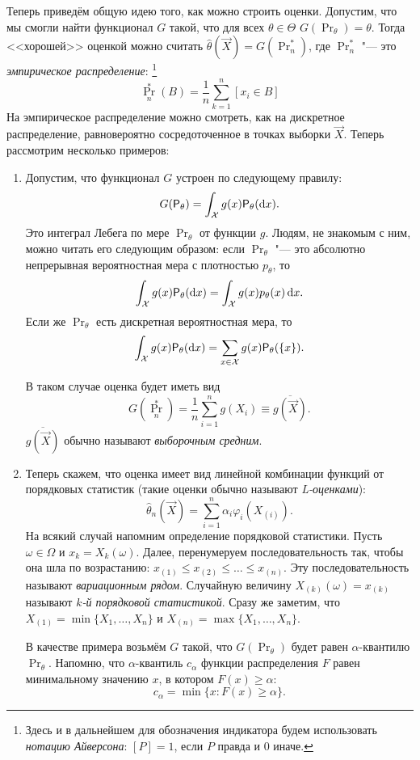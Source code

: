 Теперь приведём общую идею того, как можно строить оценки.
Допустим, что мы смогли найти функционал $G$ такой, что для всех $\theta \in \Theta$ $G(\Pr_{\theta}) = \theta$.
Тогда <<хорошей>> оценкой можно считать $\hat{\theta}(\vec{X}) = G(\Pr_{n}^{*})$, где $\Pr_{n}^{*}$ "--- это \emph{эмпирическое распределение}:%
\footnote{Здесь и в дальнейшем для обозначения индикатора будем использовать \emph{нотацию Айверсона}: $[P] = 1$, если $P$ правда и 0 иначе.}%
\[
	\Pr_{n}^{*}(B) = \frac{1}{n}\sum_{k = 1}^{n} [x_{i} \in B]
\]
На эмпирическое распределение можно смотреть, как на дискретное распределение, равновероятно сосредоточенное в точках выборки $\vec{X}$.
Теперь рассмотрим несколько примеров:
\begin{enumerate}[label=(\alph*)]
	\item Допустим, что функционал $G$ устроен по следующему правилу:
	\[
		G(\mathsf{P}_{\theta}) 
		= \int_{\mathcal{X}} g(x)\mathsf{P}_{\theta}(\mathop{}\!\mathrm{d} x).
	\]
	Это интеграл Лебега по мере $\Pr_{\theta}$ от функции $g$.
	Людям, не знакомым с ним, можно читать его следующим образом: если $\Pr_{\theta}$ "--- это абсолютно непрерывная вероятностная мера с плотностью $p_{\theta}$, то
	\[
		\int_{\mathcal{X}} g(x)\mathsf{P}_{\theta}(\mathop{}\!\mathrm{d} x) = \int_{\mathcal{X}} g(x)p_{\theta}(x)\mathop{}\!\mathrm{d} x.
	\]
	Если же $\Pr_{\theta}$ есть дискретная вероятностная мера, то
	\[
		\int_{\mathcal{X}} g(x)\mathsf{P}_{\theta}(\mathop{}\!\mathrm{d} x) = \sum_{x \in \mathcal{X}} g(x)\mathsf{P}_{\theta}(\{x\}).
	\]
	
	В таком случае оценка будет иметь вид
	\[
		G(\Pr_{n}^{*}) = \frac{1}{n}\sum_{i = 1}^{n} g(X_{i}) \equiv \overline{g(\vec{X})}.
	\]
	$\overline{g(\vec{X})}$ обычно называют \emph{выборочным средним}.
	
	\item Теперь скажем, что оценка имеет вид линейной комбинации функций от порядковых статистик (такие оценки обычно называют \emph{L-оценками}):
	\[
		\hat{\theta}_{n}(\vec{X}) = \sum_{i = 1}^{n} \alpha_{i} \varphi_{i}(X_{(i)}).
	\]
	На всякий случай напомним определение порядковой статистики.
	Пусть $\omega \in \Omega$ и $x_{k} = X_{k}(\omega)$. Далее, перенумеруем последовательность так, чтобы она шла по возрастанию: $x_{(1)} \leq x_{(2)} \leq \ldots \leq x_{(n)}$.
	Эту последовательность называют \emph{вариационным рядом}.
	Случайную величину $X_{(k)}(\omega) = x_{(k)}$ называют \emph{$k$-й порядковой статистикой}.
	Сразу же заметим, что $X_{(1)} = \min\{X_{1}, \ldots, X_{n}\}$ и $X_{(n)} = \max\{X_{1}, \ldots, X_{n}\}$.
	
	В качестве примера возьмём $G$ такой, что $G(\Pr_{\theta})$ будет равен $\alpha$-квантилю $\Pr_{\theta}$.
	Напомню, что $\alpha$-квантиль $c_{\alpha}$ функции распределения $F$ равен минимальному значению $x$, в котором $F(x) \geq \alpha$:
	\[
		c_{\alpha} = \min\{x \colon F(x) \geq \alpha\}.
	\]
	

\end{enumerate}
